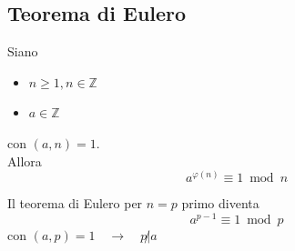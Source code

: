 \documentclass[a4paper,12pt, oneside]{book}
\begin{document}
		\subsection{Teorema di Eulero}
			\begin{teorema}
				Siano \begin{itemize}
					\item $n \geq 1, n \in \mathbb{Z}$
					\item $a \in \mathbb{Z}$
				\end{itemize}
				con $(a,n)=1$.\\
				Allora $$a^{\varphi(n)} \equiv 1 \bmod n$$
				
				\begin{osservazione}
					Il teorema di Eulero per $n=p$ primo diventa
					$$a^{p-1} \equiv 1 \bmod p$$
					con $(a,p)=1 \quad \rightarrow \quad p \not | a$
				\end{osservazione}
				

\end{teorema}
\end{document}
